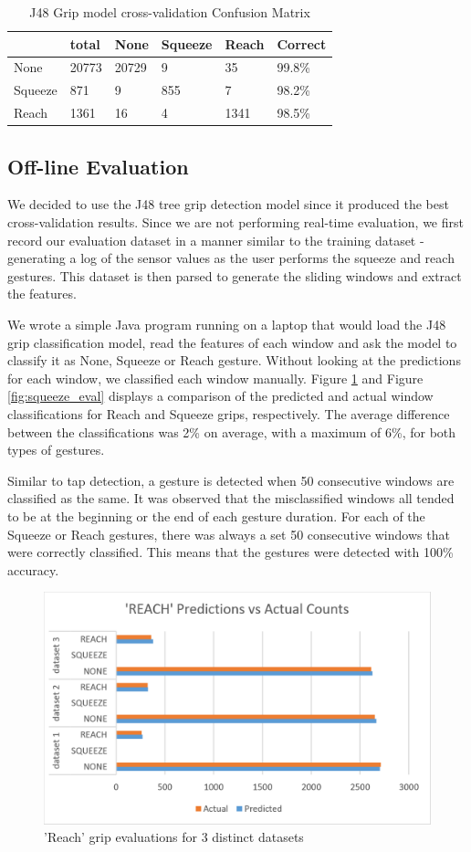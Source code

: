 \begin{table}[!t]
\caption{J48 Grip model cross-validation Confusion Matrix}
\label{tbl-Grip Model J48}
\begin{tabular}{|l||l|l|l|l|l|}
\hline
        & total & None  & Squeeze & Reach & Correct \\ \hline \hline
None    & 20773 & 20729 & 9       & 35    & 99.8\%  \\
Squeeze & 871   & 9     & 855     & 7     & 98.2\%  \\
Reach   & 1361  & 16    & 4       & 1341  & 98.5\%  \\ \hline
\end{tabular}
\end{table}


\subsection{Off-line Evaluation}
We decided to use the J48 tree grip detection model since it produced the best cross-validation results. Since we are not performing real-time evaluation, we first record our evaluation dataset in a manner similar to the training dataset - generating a log of the sensor values as the user performs the squeeze and reach gestures. This dataset is then parsed to generate the sliding windows and extract the features.
\par
We wrote a simple Java program running on a laptop that would load the J48 grip classification model, read the features of each window and ask the model to classify it as None, Squeeze or Reach gesture. Without looking at the predictions for each window, we classified each window manually. Figure \ref{fig:reach_eval} and Figure \ref{fig:squeeze_eval} displays a comparison of the predicted and actual window classifications for Reach and Squeeze grips, respectively. The average difference between the classifications was 2\% on average, with a maximum of 6\%, for both types of gestures.
\par
Similar to tap detection, a gesture is detected when 50 consecutive windows are classified as the same. It was observed that the misclassified windows all tended to be at the beginning or the end of each gesture duration. For each of the Squeeze or Reach gestures, there was always a set 50 consecutive windows that were correctly classified. This means that the gestures were detected with 100\% accuracy.

\begin{figure}[h]
\includegraphics[width=.45\textwidth]{reach_eval.png}
\caption{'Reach' grip evaluations for 3 distinct datasets}
\label{fig:reach_eval}
\end{figure}


